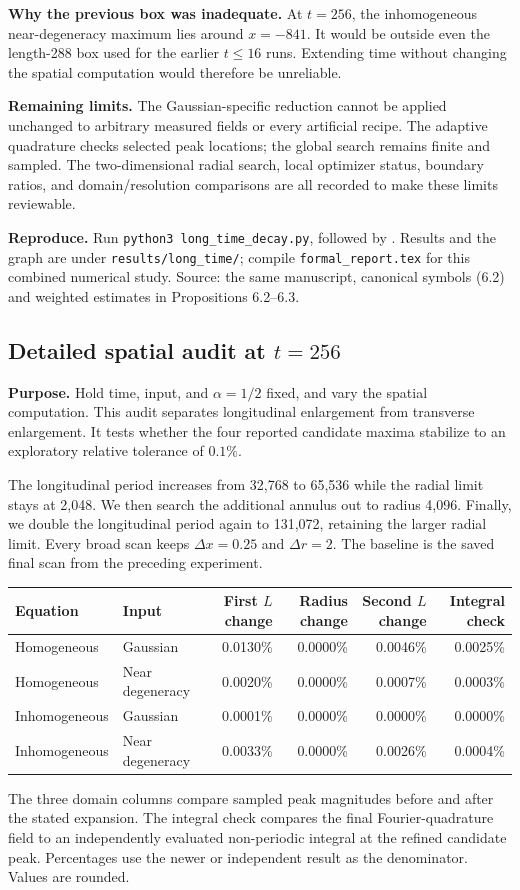 \documentclass[10pt,letterpaper]{article}
\numberwithin{equation}{section}
\newcommand{\SpatialRows}{Homogeneous & Gaussian & 0.0130\% & 0.0000\% & 0.0046\% & 0.0025\% \\
Homogeneous & Near degeneracy & 0.0020\% & 0.0000\% & 0.0007\% & 0.0003\% \\
Inhomogeneous & Gaussian & 0.0001\% & 0.0000\% & 0.0000\% & 0.0000\% \\
Inhomogeneous & Near degeneracy & 0.0033\% & 0.0000\% & 0.0026\% & 0.0004\% \\}
\begin{document}
\textbf{Why the previous box was inadequate.} At $t=256$, the inhomogeneous
near-degeneracy maximum lies around $x=-841$. It would be outside even the
length-288 box used for the earlier $t\le16$ runs. Extending time without changing
the spatial computation would therefore be unreliable.

\textbf{Remaining limits.} The Gaussian-specific reduction cannot be applied
unchanged to arbitrary measured fields or every artificial recipe. The adaptive
quadrature checks selected peak locations; the global search remains finite and
sampled. The two-dimensional radial search, local optimizer status, boundary ratios,
and domain/resolution comparisons are all recorded to make these limits reviewable.

\textbf{Reproduce.} Run \texttt{python3 long\_time\_decay.py}, followed by
. Results and the graph are under
\texttt{results/long\_time/}; compile \texttt{formal\_report.tex} for this
combined numerical study. Source: the same manuscript, canonical symbols (6.2) and
weighted estimates in Propositions 6.2--6.3.

\subsection{Detailed spatial audit at $t=256$}\label{spatialaudit}
\textbf{Purpose.} Hold time, input, and $\alpha=1/2$ fixed, and vary the spatial
computation. This audit separates longitudinal enlargement from transverse
enlargement. It tests whether the four reported candidate maxima stabilize to
an exploratory relative tolerance of $0.1\%$.

The longitudinal period increases from 32,768 to 65,536 while the radial limit
stays at 2,048. We then search the additional annulus out to radius 4,096.
Finally, we double the longitudinal period again to 131,072, retaining the
larger radial limit. Every broad scan keeps $\Delta x=0.25$ and $\Delta r=2$.
The baseline is the saved final scan from the preceding experiment.

\begin{center}\small
\begin{tabular}{llrrrr}\toprule
Equation & Input & First $L$ change & Radius change & Second $L$ change & Integral check\\\midrule
\SpatialRows
\bottomrule\end{tabular}\end{center}
The three domain columns compare sampled peak magnitudes before and after the
stated expansion. The integral check compares the final Fourier-quadrature field
to an independently evaluated non-periodic integral at the refined candidate peak.
Percentages use the newer or independent result as the denominator. Values are rounded.
\end{document}
